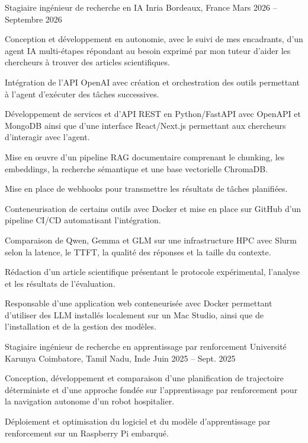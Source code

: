 
\begin{cventries}
  \cventry
    {Stagiaire ingénieur de recherche en IA}
    {Inria}
    {Bordeaux, France}
    {Mars 2026 -- Septembre 2026}
    {
      \begin{cvitems}
        \item {Conception et développement en autonomie, avec le suivi de mes encadrants, d’un agent IA multi-étapes répondant au besoin exprimé par mon tuteur d’aider les chercheurs à trouver des articles scientifiques.}
        \item {Intégration de l’API OpenAI avec création et orchestration des outils permettant à l’agent d’exécuter des tâches successives.}
        \item {Développement de services et d’API REST en Python/FastAPI avec OpenAPI et MongoDB ainsi que d’une interface React/Next.js permettant aux chercheurs d’interagir avec l’agent.}
        \item {Mise en œuvre d’un pipeline RAG documentaire comprenant le chunking, les embeddings, la recherche sémantique et une base vectorielle ChromaDB.}
        \item {Mise en place de webhooks pour transmettre les résultats de tâches planifiées.}
        \item {Conteneurisation de certains outils avec Docker et mise en place sur GitHub d’un pipeline CI/CD automatisant l’intégration.}
        \item {Comparaison de Qwen, Gemma et GLM sur une infrastructure HPC avec Slurm selon la latence, le TTFT, la qualité des réponses et la taille du contexte.}
        \item {Rédaction d’un article scientifique présentant le protocole expérimental, l’analyse et les résultats de l’évaluation.}
        \item {Responsable d’une application web conteneurisée avec Docker permettant d’utiliser des LLM installés localement sur un Mac Studio, ainsi que de l’installation et de la gestion des modèles.}
      \end{cvitems}
    }

  \cventry
    {Stagiaire ingénieur de recherche en apprentissage par renforcement}
    {Université Karunya}
    {Coimbatore, Tamil Nadu, Inde}
    {Juin 2025 -- Sept. 2025}
    {
      \begin{cvitems}
        \item {Conception, développement et comparaison d’une planification de trajectoire déterministe et d’une approche fondée sur l’apprentissage par renforcement pour la navigation autonome d’un robot hospitalier.}
        \item {Déploiement et optimisation du logiciel et du modèle d’apprentissage par renforcement sur un Raspberry Pi embarqué.}
      \end{cvitems}
    }
\end{cventries}
